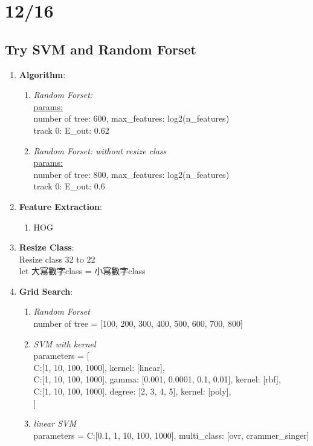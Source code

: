 \documentclass[12pt]{article}
\theoremstyle{definition}
\theoremstyle{remark}
\begin{document}
\section{12/16}
\subsection{Try SVM and Random Forset}
\begin{enumerate}
  \item \textbf{Algorithm}:
      \begin{enumerate}
          \item {\em Random Forset:\/} \\
            \underline{params:} \\
            number of tree: 600, max\_features: log2(n\_features)\\
            {\color{red}track 0: E\_out: 0.62}
          \item {\em Random Forset: without resize class \/} \\
            \underline{params:} \\
            number of tree: 800, max\_features: log2(n\_features)\\
            {\color{red}track 0: E\_out: 0.6}
      \end{enumerate}
    \item \textbf{Feature Extraction}:
      \begin{enumerate}
        \item HOG
      \end{enumerate}
    \item \textbf{Resize Class}:\\
      Resize class 32 to 22\\
      let 大寫數字class =  小寫數字class
    \item \textbf{Grid Search}:
      \begin{enumerate}
        \item {\em Random Forset\/} \\
          number of tree = [100, 200, 300, 400, 500, 600, 700, 800]
        \item {\em SVM with kernel\/}\\
        parameters = [ \\
          {C:[1, 10, 100, 1000], kernel: [linear]},\\
          {C:[1, 10, 100, 1000], gamma: [0.001, 0.0001, 0.1, 0.01], kernel: [rbf]},\\
          {C:[1, 10, 100, 1000], degree: [2, 3, 4, 5], kernel: [poly]}, \\
        ]
        \item {\em linear SVM\/}\\
        parameters = {C:[0.1, 1, 10, 100, 1000], multi\_class: [ovr, crammer\_singer]}
      \end{enumerate}
\end{enumerate}
\end{document}
